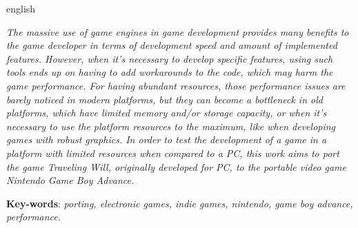 \begin{resumo}[Abstract]
 \begin{otherlanguage*}{english}

\textit{The massive use of game engines in game development provides many benefits to the game developer in terms of development speed and amount of implemented features. However, when it’s necessary to develop specific features, using such tools ends up on having to add workarounds to the code, which may harm the game performance. For having abundant resources, those performance issues are barely noticed in modern platforms, but they can become a bottleneck in old platforms, which have limited memory and/or storage capacity, or when it’s necessary to use the platform resources to the maximum, like when developing games with robust graphics. In order to test the development of a game in a platform with limited resources when compared to a PC, this work aims to port the game Traveling Will, originally developed for PC, to the portable video game Nintendo Game Boy Advance.}

   \vspace{\onelineskip}

   \noindent
   \textbf{Key-words}: \textit{porting, electronic games, indie games, nintendo, game boy advance, performance.}
 \end{otherlanguage*}
\end{resumo}
